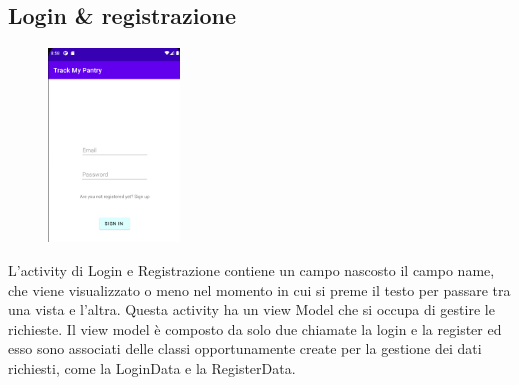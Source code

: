 \documentclass[12pt]{article}
\begin{document}
    \subsection{Login \& registrazione }
    \begin{figure}
        \includegraphics[width=3.5cm]{img/Login.PNG}
    \end{figure}
    L'activity di Login e Registrazione contiene un campo nascosto il campo name, che viene visualizzato o meno nel momento in cui si preme il testo per 
    passare tra una vista e l'altra. Questa activity ha un view Model che si occupa di gestire le richieste. Il view model è composto da solo due chiamate
    la login e la register ed esso sono associati delle classi opportunamente create per la gestione dei dati richiesti, come la LoginData e la RegisterData.\\
\end{document}
